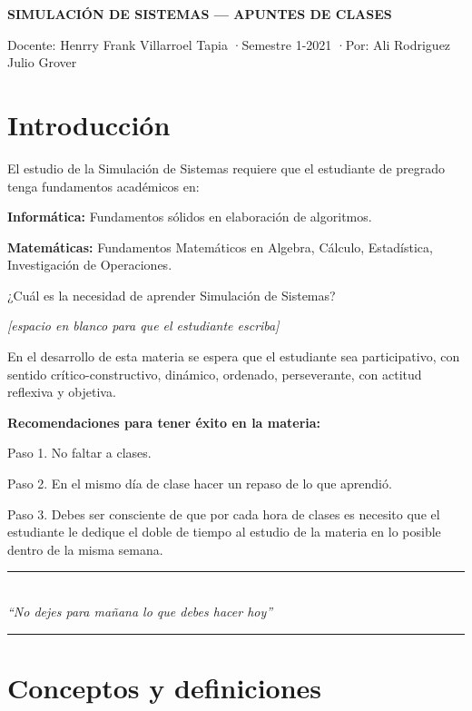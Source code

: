 \documentclass[11pt,letterpaper]{report}
\newcommand{\espacio}{\par\noindent\textit{[espacio en blanco para que el estudiante escriba]}\par}
\begin{document}
\begin{center}
{\LARGE\bfseries\linespread{1.3}\selectfont SIMULACIÓN DE SISTEMAS --- APUNTES DE CLASES\par}
\vspace{0.2cm}
{\normalsize Docente: Henrry Frank Villarroel Tapia \quad·\quad Semestre 1-2021 \quad·\quad Por: Ali Rodriguez Julio Grover\par}
\end{center}
\vspace{0.5cm}

\section*{Introducción}

El estudio de la Simulación de Sistemas requiere que el estudiante de pregrado tenga fundamentos académicos en:

\textbf{Informática:} Fundamentos sólidos en elaboración de algoritmos.

\textbf{Matemáticas:} Fundamentos Matemáticos en Algebra, Cálculo, Estadística, Investigación de Operaciones.

¿Cuál es la necesidad de aprender Simulación de Sistemas?
\espacio

En el desarrollo de esta materia se espera que el estudiante sea participativo, con sentido crítico-constructivo, dinámico, ordenado, perseverante, con actitud reflexiva y objetiva.

\textbf{Recomendaciones para tener éxito en la materia:}

Paso 1. No faltar a clases.

Paso 2. En el mismo día de clase hacer un repaso de lo que aprendió.

Paso 3. Debes ser consciente de que por cada hora de clases es necesito que el estudiante le dedique el doble de tiempo al estudio de la materia en lo posible dentro de la misma semana.

\begin{center}
\rule{0.6\textwidth}{0.4pt}\\[0.2cm]
\textit{``No dejes para mañana lo que debes hacer hoy''}\\[-0.1cm]
\rule{0.6\textwidth}{0.4pt}
\end{center}

\section*{Conceptos y definiciones}
\end{document}
